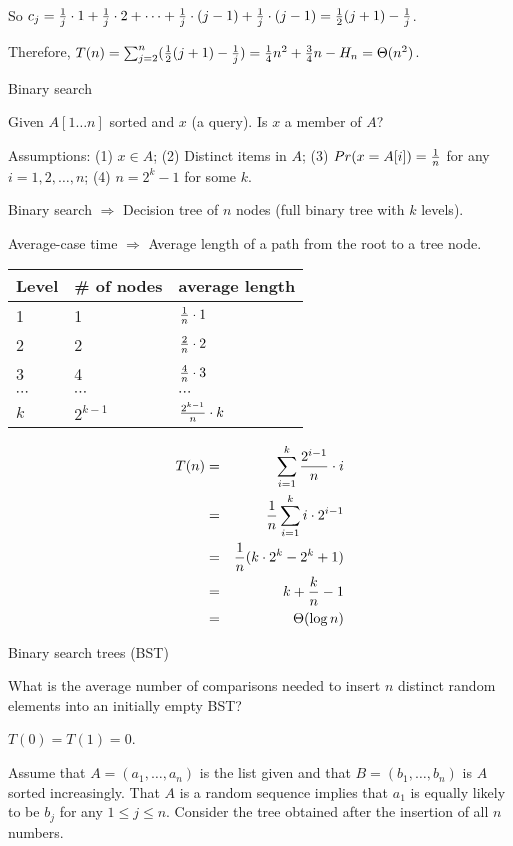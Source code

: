 \documentclass[8pt]{minimal}
\begin{document}
\begin{flushleft}
\begin{multicols}{3}
So $c_j={1\over j}\cdot 1+{1\over j}\cdot 2+\cdots+{1\over j}\cdot (j-1)
+{1\over j}\cdot (j-1)={1\over2}(j+1)-{1\over j}$.

Therefore, $T(n)=\sum_{j=2}^n({1\over2}(j+1)-{1\over j})
={1\over4}n^2+{3\over4}n-H_n=\Theta(n^2)$.


Binary search

Given $A[1\ldots n]$ sorted and $x$ (a query). Is $x$ a member of $A$?


Assumptions: (1) $x\in A$; (2) Distinct items in $A$; (3)
$Pr(x=A[i])={1\over n}$ for any $i=1,2,\ldots,n$; (4) $n=2^k-1$ for some $k$.

Binary search $\Rightarrow$ Decision tree of $n$ nodes (full binary tree
with $k$ levels).

Average-case time $\Rightarrow$ Average length of a path from the root to
a tree node.

\begin{center}
\begin{tabular}{l|l|l}
Level & \# of nodes & average length\\ \hline
1 & 1 & ${1\over n}\cdot 1$\\
2 & 2 & ${2\over n}\cdot 2$\\
3 & 4 & ${4\over n}\cdot 3$\\
$\cdots$ & $\cdots$ & $\cdots$\\
$k$ & $2^{k-1}$ & ${2^{k-1}\over n}\cdot k$
\end{tabular}
\end{center}

\begin{eqnarray*}
T(n)&=&\sum_{i=1}^k {2^{i-1}\over n}\cdot i\\
&=&{1\over n}\sum_{i=1}^k i\cdot 2^{i-1}\\
&=&{1\over n}(k\cdot 2^k-2^k+1)\\
&=&k+{k\over n}-1\\
&=&\Theta(\log n)
\end{eqnarray*}


Binary search trees (BST)

What is the average number of comparisons needed to insert $n$
distinct random elements into an initially empty BST?

$T(0)=T(1)=0$.

Assume that $A=(a_1,\ldots,a_n)$ is the list given and that 
$B=(b_1,\ldots,b_n)$ is $A$ sorted increasingly.
That $A$ is a random sequence implies that $a_1$ is equally likely
to be $b_j$ for any $1\le j\le n$. Consider the tree obtained after
the insertion of all $n$ numbers.


\end{multicols}
\end{flushleft}
\end{document}
